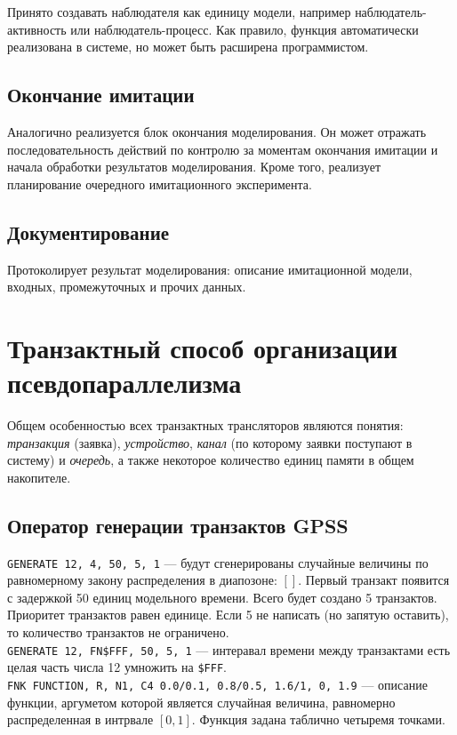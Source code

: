 \documentclass[12pt]{article}
\begin{document}
Принято создавать наблюдателя как единицу модели, например наблюдатель-активность или наблюдатель-процесс. Как правило, функция автоматически реализована в системе, но может быть расширена программистом.

\subsection{Окончание имитации}
Аналогично реализуется блок окончания моделирования. Он может отражать последовательность действий по контролю за моментам окончания имитации и начала обработки результатов моделирования. Кроме того, реализует планирование очередного имитационного эксперимента.

\subsection{Документирование}
Протоколирует результат моделирования: описание имитационной модели, входных, промежуточных и прочих данных.


\newpage
\section{Транзактный способ организации псевдопараллелизма}
Общем особенностью всех транзактных трансляторов являются понятия: \emph{транзакция} (заявка), \emph{устройство}, \emph{канал} (по которому заявки поступают в систему) и \emph{очередь}, а также некоторое количество единиц памяти в общем накопителе.

\subsection{Оператор генерации транзактов GPSS}
\texttt{GENERATE 12, 4, 50, 5, 1} --- будут сгенерированы случайные величины по равномерному закону распределения в диапозоне: $[]$. Первый транзакт появится с задержкой 50 единиц модельного времени. Всего будет создано 5 транзактов. Приоритет транзактов равен единице. Если 5 не написать (но запятую оставить), то количество транзактов не ограничено.\\

\texttt{GENERATE 12, FN\$FFF, 50, 5, 1} --- интеравал времени между транзактами есть целая часть числа 12 умножить на \texttt{\$FFF}.\\

\texttt{FNK FUNCTION, R, N1, C4 0.0/0.1, 0.8/0.5, 1.6/1, 0, 1.9} --- описание функции, аргуметом которой является случайная величина, равномерно распределенная в интрвале $[0, 1]$. Функция задана таблично четыремя точками.\\
\end{document}
